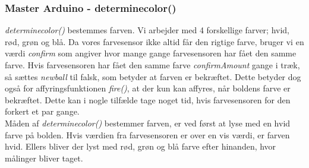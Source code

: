 \subsubsection{Master Arduino - determinecolor()}
\textit{determinecolor()} bestemmes farven. Vi arbejder med 4 forskellige farver; hvid, rød, grøn og blå. Da vores farvesensor ikke altid får den rigtige farve, bruger vi en værdi \textit{confirm} som angiver hvor mange gange farvesensoren har fået den samme farve. Hvis farvesensoren har fået den samme farve \textit{confirmAmount} gange i træk, så sættes \textit{newball} til falsk, som betyder at farven er bekræftet. Dette betyder dog også for affyringsfunktionen \textit{fire()}, at der kun kan affyres, når boldens farve er bekræftet. Dette kan i nogle tilfælde tage noget tid, hvis farvesensoren for den forkert et par gange.\\
Måden af \textit{determinecolor()} bestemmer farven, er ved først at lyse med en hvid farve på bolden. Hvis værdien fra farvesensoren er over en vis værdi, er farven hvid. Ellers bliver der lyst med rød, grøn og blå farve efter hinanden, hvor målinger bliver taget.